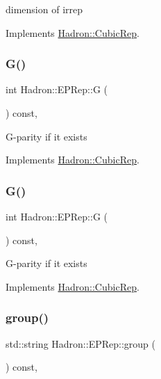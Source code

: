 dimension of irrep 

Implements \mbox{\hyperlink{structHadron_1_1CubicRep_ac178d14064f037a66af4b9fb4b312d51}{Hadron\+::\+Cubic\+Rep}}.

\mbox{\label{structHadron_1_1EPRep_acedbb348e3c15b9e210b5e187b2c08cd}} 
\subsubsection{\texorpdfstring{G()}{G()}\hspace{0.1cm}{\footnotesize\ttfamily [1/2]}}
{\footnotesize\ttfamily int Hadron\+::\+E\+P\+Rep\+::G (\begin{DoxyParamCaption}{ }\end{DoxyParamCaption}) const\hspace{0.3cm}{\ttfamily [inline]}, {\ttfamily [virtual]}}

G-\/parity if it exists 

Implements \mbox{\hyperlink{structHadron_1_1CubicRep_a52104e43266d1614c00bbd1c3b395458}{Hadron\+::\+Cubic\+Rep}}.

\mbox{\label{structHadron_1_1EPRep_acedbb348e3c15b9e210b5e187b2c08cd}} 
\subsubsection{\texorpdfstring{G()}{G()}\hspace{0.1cm}{\footnotesize\ttfamily [2/2]}}
{\footnotesize\ttfamily int Hadron\+::\+E\+P\+Rep\+::G (\begin{DoxyParamCaption}{ }\end{DoxyParamCaption}) const\hspace{0.3cm}{\ttfamily [inline]}, {\ttfamily [virtual]}}

G-\/parity if it exists 

Implements \mbox{\hyperlink{structHadron_1_1CubicRep_a52104e43266d1614c00bbd1c3b395458}{Hadron\+::\+Cubic\+Rep}}.

\mbox{\label{structHadron_1_1EPRep_a616ca775839a0a87e82fbef0de6f1cab}} 
\subsubsection{\texorpdfstring{group()}{group()}\hspace{0.1cm}{\footnotesize\ttfamily [1/2]}}
{\footnotesize\ttfamily std\+::string Hadron\+::\+E\+P\+Rep\+::group (\begin{DoxyParamCaption}{ }\end{DoxyParamCaption}) const\hspace{0.3cm}{\ttfamily [inline]}, {\ttfamily [virtual]}}

